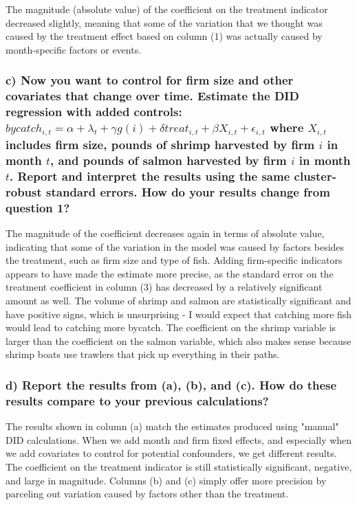 \documentclass{article}
\begin{document}
The magnitude (absolute value) of the coefficient on the treatment indicator decreased slightly, meaning that some of the variation that we thought was caused by the treatment effect based on column (1) was actually caused by month-specific factors or events. 

\subsubsection*{c) Now you want to control for firm size and other covariates that change over time. Estimate the DID regression with added controls: $bycatch_{i,t} = \alpha + \lambda_t + \gamma g(i) + \delta treat_{i,t} + \beta X_{i,t} + \epsilon_{i,t}$
where $X_{i,t}$ includes firm size, pounds of shrimp harvested by firm $i$ in month $t$, and pounds of salmon harvested by firm $i$ in month $t$. Report and interpret the results using the same cluster- robust standard errors. How do your results change from question 1?}

The magnitude of the coefficient decreases again in terms of absolute value, indicating that some of the variation in the model was caused by factors besides the treatment, such as firm size and type of fish. Adding firm-specific indicators appears to have made the estimate more precise, as the standard error on the treatment coefficient in column (3) has decreased by a relatively significant amount as well. The volume of shrimp and salmon are statistically significant and have positive signs, which is unsurprising - I would expect that catching more fish would lead to catching more bycatch. The coefficient on the shrimp variable is larger than the coefficient on the salmon variable, which also makes sense because shrimp boats use trawlers that pick up everything in their paths. 

\subsubsection*{d) Report the results from (a), (b), and (c). How do these results compare to your previous calculations?}

The results shown in column (a) match the estimates produced using "manual" DID calculations. When we add month and firm fixed effects, and especially when we add covariates to control for potential confounders, we get different results. The coefficient on the treatment indicator is still statistically significant, negative, and large in magnitude. Columns (b) and (c) simply offer more precision by parceling out variation caused by factors other than the treatment. 
\end{document}
